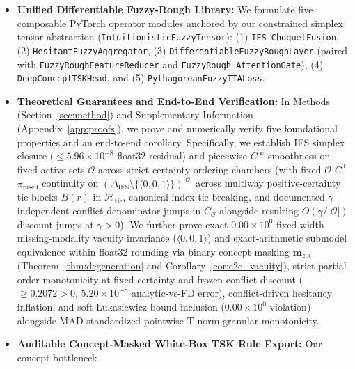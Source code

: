 \documentclass[10pt,twocolumn]{article}
\begin{document}
\begin{itemize}[leftmargin=1.3em,itemsep=1pt,topsep=2pt]
    \item \textbf{Unified Differentiable Fuzzy-Rough Library:} We formulate five composable
    PyTorch operator modules anchored by our constrained simplex tensor abstraction
    (\texttt{Intuitionistic\allowbreak Fuzzy\allowbreak Tensor}): (1) \texttt{IFS\allowbreak
    Choquet\allowbreak Fusion}, (2) \texttt{Hesitant\allowbreak Fuzzy\allowbreak Aggregator},
    (3) \texttt{Differentiable\allowbreak Fuzzy\allowbreak Rough\allowbreak Layer} (paired with
    \texttt{FuzzyRough\allowbreak Feature\allowbreak Reducer} and \texttt{FuzzyRough\allowbreak
    AttentionGate}), (4) \texttt{Deep\allowbreak Concept\allowbreak TSK\allowbreak Head}, and
    (5) \texttt{Pythagorean\allowbreak Fuzzy\allowbreak TTA\allowbreak Loss}.
    \item \textbf{Theoretical Guarantees and End-to-End Verification:}
    In Methods (Section~\ref{sec:method}) and Supplementary Information
    (Appendix~\ref{app:proofs}), we prove and numerically verify five foundational properties
    and an end-to-end corollary.
    Specifically, we
    establish IFS simplex closure ($\le 5.96\times 10^{-8}$ float32 residual) and piecewise
    $C^\infty$ smoothness on fixed active sets $\mathcal{O}$ across strict certainty-ordering
    chambers (with fixed-$\mathcal{O}$ $C^0$ $\pi_{\text{fused}}$ continuity on
    $(\Delta_{\text{IFS}} \setminus \{\langle 0,0,1\rangle\})^{|\mathcal{O}|}$ across multiway
    positive-certainty tie blocks $B(r)$ in $\mathcal{H}_{\text{tie}}$, canonical index
    tie-breaking, and documented $\gamma$-independent conflict-denominator jumps in
    $C_{\mathcal{O}}$ alongside resulting $O(\gamma/|\mathcal{O}|)$ discount jumps at $\gamma >
    0$). We further prove exact $0.00\times 10^0$ fixed-width missing-modality vacuity
    invariance ($\langle 0,0,1\rangle$) and exact-arithmetic submodel equivalence within
    float32 rounding via binary concept masking $\bm{m}_{z,i}$ (Theorem~\ref{thm:degeneration}
    and Corollary~\ref{cor:e2e_vacuity}), strict partial-order monotonicity at fixed certainty
    and frozen conflict discount ($\ge 0.2072>0$,
    $5.20\times 10^{-8}$ analytic-vs-FD error), conflict-driven hesitancy inflation, and
    soft-{\L}ukasiewicz bound inclusion ($0.00\times 10^0$ violation) alongside
    MAD-standardized pointwise T-norm granular monotonicity.
    \item \textbf{Auditable Concept-Masked White-Box TSK Rule Export:} Our concept-bottleneck

\end{itemize}
\end{document}
